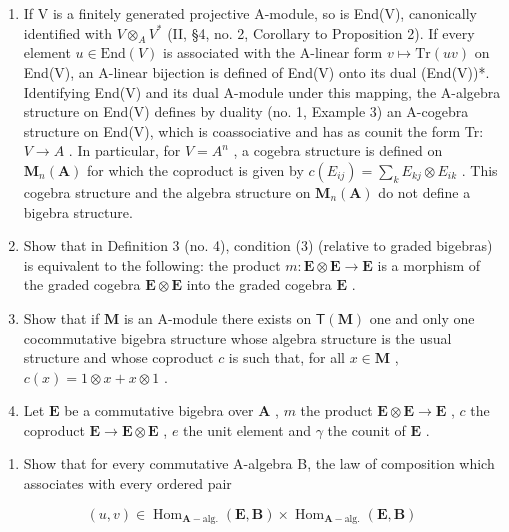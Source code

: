 \BourbakiExercisesSection

\begin{enumerate}
\def\labelenumi{\arabic{enumi}.}
\item
  If V is a finitely generated projective A-module, so is End(V), canonically identified with \(V \otimes_{A} V^{*}\) (II, §4, no. 2, Corollary to Proposition 2). If every element \(u \in \text{End}(V)\) is associated with the A-linear form \(v \mapsto \text{Tr}(uv)\) on End(V), an A-linear bijection is defined of End(V) onto its dual (End(V))*. Identifying End(V) and its dual A-module under this mapping, the A-algebra structure on End(V) defines by duality (no. 1, Example 3) an A-cogebra structure on End(V), which is coassociative and has as counit the form Tr: \(V \to A\) . In particular, for \(V = A^{n}\) , a cogebra structure is defined on \(\mathbf{M}_{n}(\mathbf{A})\) for which the coproduct is given by \(c(E_{ij}) = \sum_{k} E_{kj} \otimes E_{ik}\) . This cogebra structure and the algebra structure on \(\mathbf{M}_{n}(\mathbf{A})\) do not define a bigebra structure.
\item
  Show that in Definition 3 (no. 4), condition (3) (relative to graded bigebras) is equivalent to the following: the product \(m: \mathbf{E} \otimes \mathbf{E} \to \mathbf{E}\) is a morphism of the graded cogebra \(\mathbf{E} \otimes \mathbf{E}\) into the graded cogebra \(\mathbf{E}\) .
\item
  Show that if \(\mathbf{M}\) is an A-module there exists on \(\mathsf{T}(\mathbf{M})\) one and only one cocommutative bigebra structure whose algebra structure is the usual structure and whose coproduct \(c\) is such that, for all \(x\in \mathbf{M}\) , \(c(x) = 1\otimes x + x\otimes 1\) .
\item
  Let \(\mathbf{E}\) be a commutative bigebra over \(\mathbf{A}\) , \(m\) the product \(\mathbf{E} \otimes \mathbf{E} \to \mathbf{E}\) , \(c\) the coproduct \(\mathbf{E} \to \mathbf{E} \otimes \mathbf{E}\) , \(e\) the unit element and \(\gamma\) the counit of \(\mathbf{E}\) .
\end{enumerate}

\begin{enumerate}
\def\labelenumi{(\alph{enumi})}
\tightlist
\item
  Show that for every commutative A-algebra B, the law of composition which associates with every ordered pair
\end{enumerate}

\[
(u, v) \in \operatorname{Hom} _ {\mathbf {A} - \mathrm{alg.}} (\mathbf {E}, \mathbf {B}) \times \operatorname{Hom} _ {\mathbf {A} - \mathrm{alg.}} (\mathbf {E}, \mathbf {B})
\]

